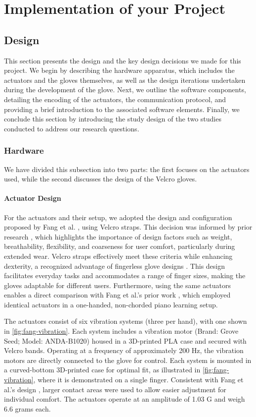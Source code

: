\chapter{Implementation of your Project}
\label{ch:Implementation}

\section{Design}
This section presents the design and the key design decisions we made for this project.
We begin by describing the hardware apparatus, which includes the actuators and the gloves themselves, as well as the design iterations undertaken during the development of the glove.
Next, we outline the software components, detailing the encoding of the actuators, the communication protocol, and providing a brief introduction to the associated software elements.
Finally, we conclude this section by introducing the study design of the two studies conducted to address our research questions.


\subsection{Hardware}
We have divided this subsection into two parts: the first focuses on the actuators used, while the second discusses the design of the Velcro gloves.

\subsubsection{Actuator Design}
For the actuators and their setup, we adopted the design and configuration proposed by Fang et al. \cite{Fang2023}, using Velcro straps. This decision was informed by prior research \cite{Markow2010, Kohlsdorf2010, Huang2010, Fang2023a}, which highlights the importance of design factors such as weight, breathability, flexibility, and coarseness for user comfort, particularly during extended wear. Velcro straps effectively meet these criteria while enhancing dexterity, a recognized advantage of fingerless glove designs \cite{Huang2008}. This design facilitates everyday tasks and accommodates a range of finger sizes, making the gloves adaptable for different users. Furthermore, using the same actuators enables a direct comparison with Fang et al.’s prior work \cite{Fang2023}, which employed identical actuators in a one-handed, non-chorded piano learning setup.

The actuators consist of six vibration systems (three per hand), with one shown in \autoref{fig:fang-vibration}. Each system includes a vibration motor (Brand: Grove Seed; Model: ANDA-B1020) housed in a 3D-printed PLA case and secured with Velcro bands. Operating at a frequency of approximately 200 Hz, the vibration motors are directly connected to the glove for control. Each system is mounted in a curved-bottom 3D-printed case for optimal fit, as illustrated in \autoref{fig:fang-vibration}, where it is demonstrated on a single finger. Consistent with Fang et al.’s design \cite{Fang2023}, larger contact areas were used to allow easier adjustment for individual comfort. The actuators operate at an amplitude of 1.03 G and weigh 6.6 grams each.

